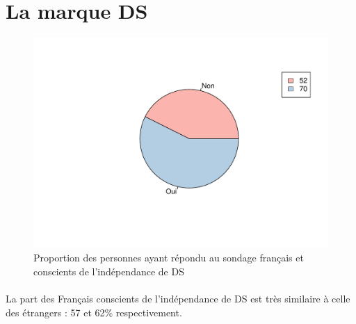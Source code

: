 \documentclass[12pt]{article}\usepackage[]{graphicx}\usepackage[]{color}
\makeatletter
\def\maxwidth{ %
  \ifdim\Gin@nat@width>\linewidth
    \linewidth
  \else
    \Gin@nat@width
  \fi
}
\newenvironment{knitrout}{}{} %
\makeatother
\begin{document}
\break
\section{La marque DS}

\begin{knitrout}
\color{fgcolor}\begin{figure}[H]
\includegraphics[width=\maxwidth]{figure/ds_know_fr-1} \caption[Proportion des personnes ayant répondu au sondage français et conscients de l'indépendance de DS]{Proportion des personnes ayant répondu au sondage français et conscients de l'indépendance de DS}\label{fig:ds know fr}
\end{figure}


\end{knitrout}

%
%

\paragraph{} La part des Français conscients de l'indépendance de DS est
très similaire à celle des étrangers : 57 et 62\% respectivement.
\end{document}
